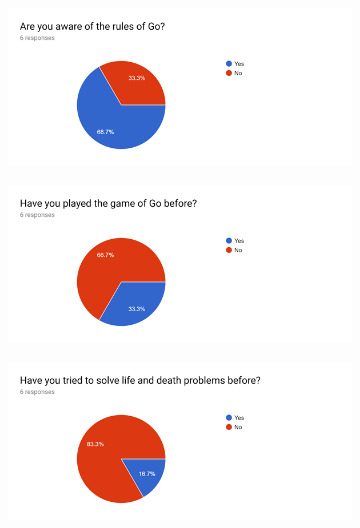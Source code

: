 \documentclass{l4proj}
\begin{document}
\begin{appendices}
\begin{figure}[H]
\centering
\begin{subfigure}[b]{\textwidth}
\centering
\includegraphics[width=\textwidth]{A1/1.png}
\end{subfigure}
\end{figure}

\begin{figure}[!ht]
\centering
\begin{subfigure}[b]{\textwidth}
\centering
\includegraphics[width=\textwidth]{A1/2.png}
\end{subfigure}
\end{figure}


\begin{figure}[H]
\centering
\begin{subfigure}[b]{\textwidth}
\centering
\includegraphics[width=\textwidth]{A1/3.png}
\end{subfigure}
\end{figure}


\end{appendices}
\end{document}
